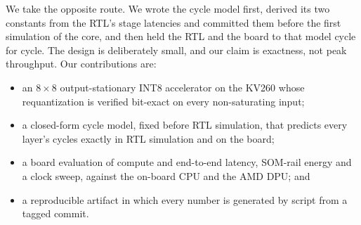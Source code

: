 We take the opposite route. We wrote the cycle model first, derived its two
constants from the RTL's stage latencies and committed them before the first
simulation of the core, and then held the RTL and the board to that model
cycle for cycle. The design is deliberately small, and our claim is
exactness, not peak throughput. Our contributions are:
\begin{itemize}
\item an $8{\times}8$ output-stationary INT8 accelerator on the KV260 whose
requantization is verified bit-exact on every non-saturating input;
\item a closed-form cycle model, fixed before RTL simulation, that predicts
every layer's cycles exactly in RTL simulation and on the board;
\item a board evaluation of compute and end-to-end latency, SOM-rail energy and a
clock sweep, against the on-board CPU and the AMD DPU; and
\item a reproducible artifact in which every number is generated by script
from a tagged commit.
\end{itemize}
